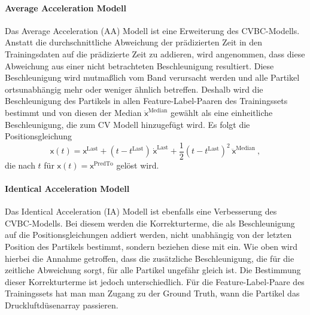 \paragraph{Average Acceleration Modell}




Das Average Acceleration (AA) Modell ist eine Erweiterung des CVBC-Modells.
Anstatt die durchschnittliche Abweichung der prädizierten Zeit in den Trainingsdaten auf die prädizierte Zeit zu addieren, wird angenommen, 
dass diese Abweichung aus einer nicht betrachteten Beschleunigung resultiert.
Diese Beschleunigung wird mutmaßlich vom Band verursacht werden und alle Partikel ortsunabhängig mehr oder weniger ähnlich betreffen.
Deshalb wird die Beschleunigung des Partikels in allen Feature-Label-Paaren des Trainingssets bestimmt
und von diesen der Median \(\ddot{ \mathsf{x}}^{\text{Median}}\) gewählt als eine einheitliche Beschleunigung, die zum CV Modell hinzugefügt wird.
Es folgt die Positionsgleichung
\begin{equation*}
    \mathsf{x}(t) =  \mathsf{x}^{\text{Last}} + (t - t^{\text{Last}}) \: \dot{ \mathsf{x}}^{\text{Last}} 
    + \frac{1}{2} (t - t^{\text{Last}})^2 \: \ddot{ \mathsf{x}}^{\text{Median}} \: ,
\end{equation*}
% 
die nach \(t\) für \(\mathsf{x}(t) =  \mathsf{x}^{\text{PredTo}}\) gelöst wird.


\paragraph{Identical Acceleration Modell}


Das Identical Acceleration (IA) Modell ist ebenfalls eine Verbesserung des CVBC-Modells. 
Bei diesem werden die Korrekturterme, die als Beschleunigung auf die Positionsgleichungen addiert werden, nicht unabhängig von der letzten Position des Partikels bestimmt, sondern beziehen diese mit ein.
Wie oben wird hierbei die Annahme getroffen, dass die zusätzliche Beschleunigung, die für die zeitliche Abweichung sorgt, für alle Partikel ungefähr gleich ist.
Die Bestimmung dieser Korrekturterme ist jedoch unterschiedlich.
Für die Feature-Label-Paare des Trainingssets hat man man Zugang zu der Ground Truth, wann die Partikel das Druckluftdüsenarray passieren.

